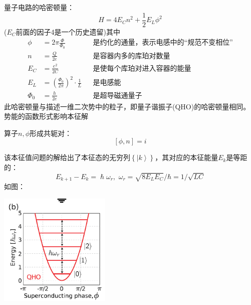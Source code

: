 \documentclass[12pt, a4paper, oneside]{ctexbook}
\newcounter{#2}
\newcounter{#2}[#1]
\numberwithin{#2}{#1}
\newcommand{\xkuo}[1]{\left(#1\right)}
\newcommand{\dkuo}[1]{\left\lbrace#1\right\rbrace}
\newcommand{\akuo}[1]{\left[#1\right]}
\newcommand{\ket}[1]{\left| #1 \right\rangle}
\begin{document}
            \begin{theorem}
                量子电路的哈密顿量：
                \begin{equation}
                    H=4E_Cn^2+\frac12E_L\phi^2
                \end{equation}
                (\(E_C\)前面的因子4是一个历史遗留)其中
                \begin{align}
                    \phi&=2\pi\frac{\Phi}{\Phi_0}&&\text{是约化的通量，表示电感中的“规范不变相位”}\\
                    n&=\frac{Q}{2e}&&\text{是容器内多的库珀对数量}\\
                    E_C&=\frac{e^2}{2C}&&\text{是使每个库珀对进入容器的能量}\\
                    E_L&=\xkuo{\frac{\Phi_0}{2\pi}}^2\cdot\frac1L&&\text{是电感能}\\
                    \Phi_0&=\frac{h}{2e}&&\text{是超导磁通量子}
                \end{align}
                此哈密顿量与描述一维二次势中的粒子，即量子谐振子(QHO)的哈密顿量相同。势能的函数形式影响本征解
            \end{theorem}
            \begin{theorem}
                算子\(n,\phi\)形成共轭对：
                \begin{equation}
                    \akuo{\phi,n}=i
                \end{equation}
            \end{theorem}
            \begin{theorem}
                该本征值问题的解给出了本征态的无穷列\(\dkuo{\ket{k}}\)，其对应的本征能量\(E_k\)是等距的：
                \begin{equation}
                    E_{k+1}-E_k=\hslash\omega_r,\,\,\omega_r=\sqrt{8 E_L E_C} / \hbar=1 / \sqrt{L C}
                \end{equation}
                如图：

                \centering
                \includegraphics[width=0.4\textwidth]{scr/本征解.png}
            \end{theorem}
\end{document}
